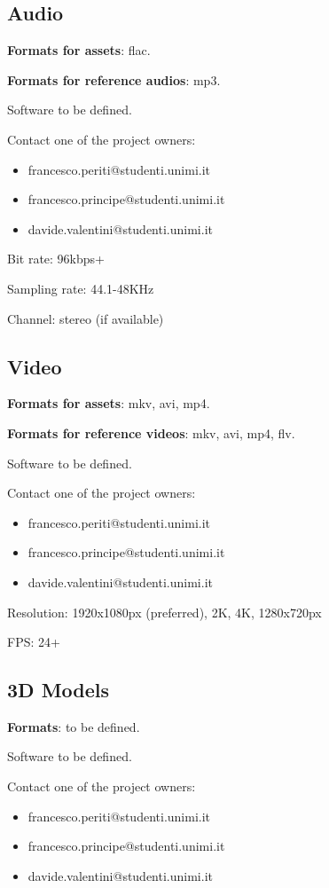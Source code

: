 \documentclass[12pt]{article}
\begin{document}
\subsection{Audio}

\textbf{Formats for assets}: flac.

\textbf{Formats for reference audios}: mp3.

Software to be defined.

Contact one of the project owners:
\begin{itemize}
	\item francesco.periti@studenti.unimi.it
	\item francesco.principe@studenti.unimi.it
	\item davide.valentini@studenti.unimi.it
\end{itemize}

Bit rate: 96kbps+

Sampling rate: 44.1-48KHz

Channel: stereo (if available)

\subsection{Video}
\textbf{Formats for assets}: mkv, avi, mp4.

\textbf{Formats for reference videos}: mkv, avi, mp4, flv.

Software to be defined.

Contact one of the project owners:
\begin{itemize}
	\item francesco.periti@studenti.unimi.it
	\item francesco.principe@studenti.unimi.it
	\item davide.valentini@studenti.unimi.it
\end{itemize}

Resolution: 1920x1080px (preferred), 2K, 4K, 1280x720px

FPS: 24+

\subsection{3D Models}
\textbf{Formats}: to be defined.

Software to be defined.

Contact one of the project owners:
\begin{itemize}
	\item francesco.periti@studenti.unimi.it
	\item francesco.principe@studenti.unimi.it
	\item davide.valentini@studenti.unimi.it
\end{itemize}
\end{document}
